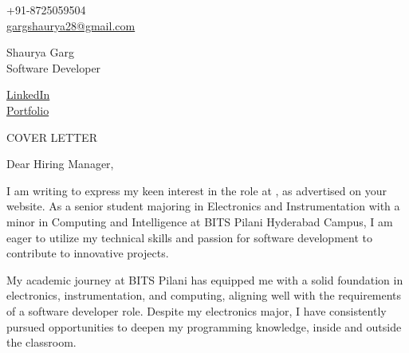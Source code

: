 \documentclass[11pt,a4]{article}
\begin{document}
\begin{center}
    \begin{minipage}[b]{0.24\textwidth}
            \large +91-8725059504 \\
            \large \href{mailto:youremail@email.com}{gargshaurya28@gmail.com} 
    \end{minipage}%
    \begin{minipage}[b]{0.5\textwidth}
            \centering
            {\Huge Shaurya Garg} \\ %
            \vspace{0.1cm}
            {\color{UI_blue} \Large{Software Developer}} \\
    \end{minipage}%
    \begin{minipage}[b]{0.24\textwidth}
            \flushright \large
            {\href{https://www.linkedin.com/in/shaurya-garg-988675202/}{LinkedIn} } \\
            \href{https://portfolio-nextjs-shaurya5.vercel.app/}{Portfolio}
    \end{minipage}   
    
\vspace{-0.15cm} 
{\color{UI_blue} \hrulefill}
\end{center}

\justify
\setlength{\parindent}{0pt}
\setlength{\parskip}{12pt}
\vspace{0.2cm}
\begin{center}
    {\color{UI_blue} \Large{COVER LETTER}}
\end{center}

\def \company {}
\def \companys {}
\def \role {}


Dear Hiring Manager, %

I am writing to express my keen interest in the \role role at \company, as advertised on your website. As a senior student majoring in Electronics and Instrumentation with a minor in Computing and Intelligence at BITS Pilani Hyderabad Campus, I am eager to utilize my technical skills and passion for software development to contribute to \companys innovative projects. \par

My academic journey at BITS Pilani has equipped me with a solid foundation in electronics, instrumentation, and computing, aligning well with the requirements of a software developer role. Despite my electronics major, I have consistently pursued opportunities to deepen my programming knowledge, inside and outside the classroom. \par
\end{document}
